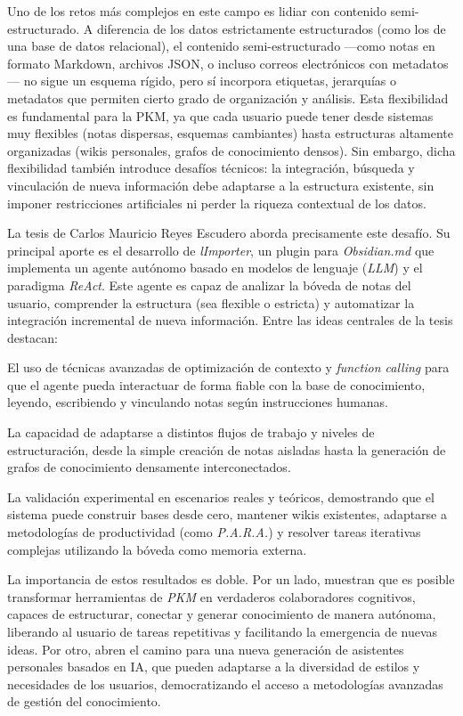 Uno de los retos más complejos en este campo es lidiar con contenido semi-estructurado. A diferencia de los datos estrictamente estructurados (como los de una base de datos relacional), el contenido semi-estructurado —como notas en formato Markdown, archivos JSON, o incluso correos electrónicos con metadatos— no sigue un esquema rígido, pero sí incorpora etiquetas, jerarquías o metadatos que permiten cierto grado de organización y análisis. Esta flexibilidad es fundamental para la PKM, ya que cada usuario puede tener desde sistemas muy flexibles (notas dispersas, esquemas cambiantes) hasta estructuras altamente organizadas (wikis personales, grafos de conocimiento densos). Sin embargo, dicha flexibilidad también introduce desafíos técnicos: la integración, búsqueda y vinculación de nueva información debe adaptarse a la estructura existente, sin imponer restricciones artificiales ni perder la riqueza contextual de los datos.

La tesis de Carlos Mauricio Reyes Escudero aborda precisamente este desafío. Su principal aporte es el desarrollo de \textit{lImporter}, un plugin para \textit{Obsidian.md} que implementa un agente autónomo basado en modelos de lenguaje (\textit{LLM}) y el paradigma \textit{ReAct}. Este agente es capaz de analizar la bóveda de notas del usuario, comprender la estructura (sea flexible o estricta) y automatizar la integración incremental de nueva información. Entre las ideas centrales de la tesis destacan:

El uso de técnicas avanzadas de optimización de contexto y \textit{function calling} para que el agente pueda interactuar de forma fiable con la base de conocimiento, leyendo, escribiendo y vinculando notas según instrucciones humanas.

\newpage

La capacidad de adaptarse a distintos flujos de trabajo y niveles de estructuración, desde la simple creación de notas aisladas hasta la generación de grafos de conocimiento densamente interconectados.

La validación experimental en escenarios reales y teóricos, demostrando que el sistema puede construir bases desde cero, mantener wikis existentes, adaptarse a metodologías de productividad (como \textit{P.A.R.A.}) y resolver tareas iterativas complejas utilizando la bóveda como memoria externa.

La importancia de estos resultados es doble. Por un lado, muestran que es posible transformar herramientas de \textit{PKM} en verdaderos colaboradores cognitivos, capaces de estructurar, conectar y generar conocimiento de manera autónoma, liberando al usuario de tareas repetitivas y facilitando la emergencia de nuevas ideas. Por otro, abren el camino para una nueva generación de asistentes personales basados en IA, que pueden adaptarse a la diversidad de estilos y necesidades de los usuarios, democratizando el acceso a metodologías avanzadas de gestión del conocimiento.

